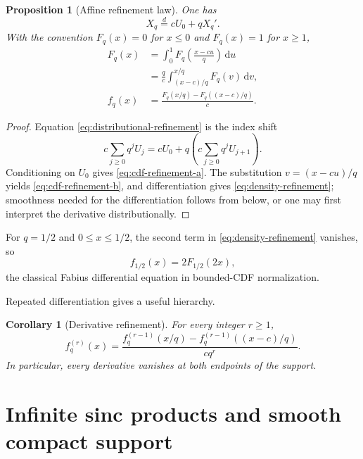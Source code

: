 \documentclass[11pt,oneside]{article}
\newtheorem{proposition}[theorem]{Proposition}
\newtheorem{corollary}[theorem]{Corollary}
\theoremstyle{definition}
\theoremstyle{remark}
\newcommand{\dd}{\,\mathrm d}
\begin{document}
\begin{proposition}[Affine refinement law]
\label{prop:refinement}
One has
\begin{equation}
 X_q\overset d=cU_0+qX_q'.                  \label{eq:distributional-refinement}
\end{equation}
With the convention $F_q(x)=0$ for $x\le0$ and $F_q(x)=1$ for $x\ge1$,
\begin{align}
 F_q(x)
 &=\int_0^1 F_q\!\left(\frac{x-cu}{q}\right)\dd u            \label{eq:cdf-refinement-a}\\
 &=\frac{q}{c}\int_{(x-c)/q}^{x/q}F_q(v)\dd v,               \label{eq:cdf-refinement-b}\\
 f_q(x)
 &=\frac{F_q(x/q)-F_q((x-c)/q)}{c}.                            \label{eq:density-refinement}
\end{align}
\end{proposition}

\begin{proof}
Equation \eqref{eq:distributional-refinement} is the index shift
\[
 c\sum_{j\ge0}q^jU_j=cU_0+q\left(c\sum_{j\ge0}q^jU_{j+1}\right).
\]
Conditioning on $U_0$ gives \eqref{eq:cdf-refinement-a}.  The substitution
$v=(x-cu)/q$ yields \eqref{eq:cdf-refinement-b}, and differentiation gives
\eqref{eq:density-refinement}; smoothness needed for the differentiation follows from
 below, or one may first interpret the derivative distributionally.
\end{proof}

For $q=1/2$ and $0\le x\le1/2$, the second term in
\eqref{eq:density-refinement} vanishes, so
\[
 f_{1/2}(x)=2F_{1/2}(2x),
\]
the classical Fabius differential equation in bounded-CDF normalization.

Repeated differentiation gives a useful hierarchy.

\begin{corollary}[Derivative refinement]
\label{cor:derivative-refinement}
For every integer $r\ge1$,
\begin{equation}
 f_q^{(r)}(x)
 =\frac{f_q^{(r-1)}(x/q)-f_q^{(r-1)}((x-c)/q)}{c q^r}.         \label{eq:derivative-refinement}
\end{equation}
In particular, every derivative vanishes at both endpoints of the support.
\end{corollary}

\section{Infinite sinc products and smooth compact support}
\label{sec:fourier}
\end{document}

